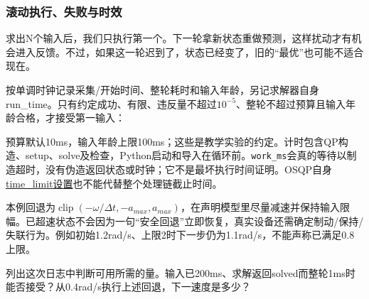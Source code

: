 \subsubsection{滚动执行、失败与时效}
求出N个输入后，我们只执行第一个。下一轮拿新状态重做预测，这样扰动才有机会进入反馈。不过，如果这一轮迟到了，状态已经变了，旧的“最优”也可能不适合现在。

\begin{example}[别只看solved这一行]
按单调时钟记录采集/开始时间、整轮耗时和输入年龄，另记求解器自身run\_time。只有约定成功、有限、违反量不超过$10^{-5}$、整轮不超过预算且输入年龄合格，才接受第一输入：

预算默认10ms，输入年龄上限100ms；这些是教学实验的约定。计时包含QP构造、setup、solve及检查，Python启动和导入在循环前。\texttt{work\_ms}会真的等待以制造超时，没有伪造返回状态或时钟；它不是最坏执行时间证明。OSQP自身\href{https://osqp.org/docs/interfaces/solver_settings.html}{time\_limit设置}也不能代替整个处理链截止时间。

本例回退为$\operatorname{clip}(-\omega/\Delta t,-a_{max},a_{max})$，在声明模型里尽量减速并保持输入限幅。已超速状态不会因为一句“安全回退”立即恢复，真实设备还需确定制动/保持/失联行为。例如初始1.2rad/s、上限2时下一步仍为1.1rad/s，不能声称已满足0.8上限。
\end{example}
\begin{exercise}\label{ex:v2-mpc-gate}
列出这次日志中判断可用所需的量。输入已200ms、求解返回solved而整轮1ms时能否接受？从0.4rad/s执行上述回退，下一速度是多少？
\end{exercise}

